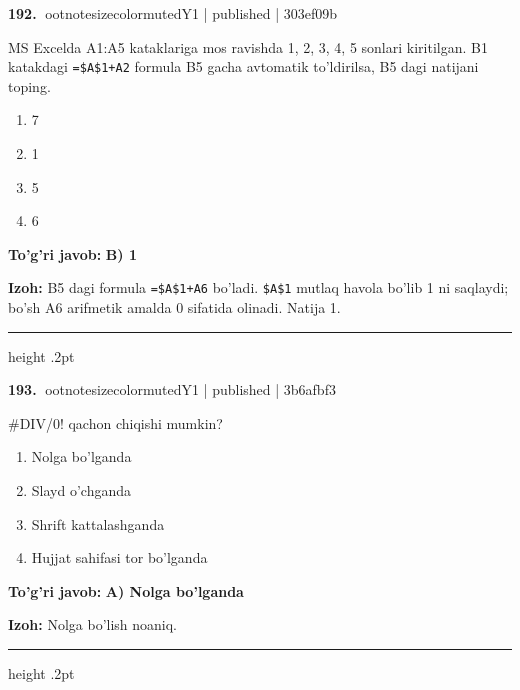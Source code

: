 \documentclass[10pt,a4paper]{article}
\begin{document}
\textbf{\color{ink}192.} {ootnotesizecolor{muted}Y1 | published | 303ef09b}
\par
MS Excelda A1:A5 kataklariga mos ravishda 1, 2, 3, 4, 5 sonlari kiritilgan. B1 katakdagi \texttt{=\$A\$1+A2} formula B5 gacha avtomatik to'ldirilsa, B5 dagi natijani toping.
\begin{enumerate}[label=\Alph*),leftmargin=9mm]
\item 7
\item 1
\item 5
\item 6
\end{enumerate}
\begin{tcolorbox}[enhanced,breakable,colback=teal!4,colframe=teal!55!black,boxrule=0.45pt,arc=1.2mm,left=2.8mm,right=2.8mm,top=2mm,bottom=2mm]
\textbf{\color{teal}To'g'ri javob:} \textbf{B) 1}
\par\smallskip
\textbf{Izoh:} B5 dagi formula \texttt{=\$A\$1+A6} bo'ladi. \texttt{\$A\$1} mutlaq havola bo'lib 1 ni saqlaydi; bo'sh A6 arifmetik amalda 0 sifatida olinadi. Natija 1.
\end{tcolorbox}
\vspace{2mm}\hrule height .2pt\vspace{2mm}

\textbf{\color{ink}193.} {ootnotesizecolor{muted}Y1 | published | 3b6afbf3}
\par
\#DIV/0! qachon chiqishi mumkin?
\begin{enumerate}[label=\Alph*),leftmargin=9mm]
\item Nolga bo'lganda
\item Slayd o'chganda
\item Shrift kattalashganda
\item Hujjat sahifasi tor bo'lganda
\end{enumerate}
\begin{tcolorbox}[enhanced,breakable,colback=teal!4,colframe=teal!55!black,boxrule=0.45pt,arc=1.2mm,left=2.8mm,right=2.8mm,top=2mm,bottom=2mm]
\textbf{\color{teal}To'g'ri javob:} \textbf{A) Nolga bo'lganda}
\par\smallskip
\textbf{Izoh:} Nolga bo'lish noaniq.
\end{tcolorbox}
\vspace{2mm}\hrule height .2pt\vspace{2mm}
\end{document}
